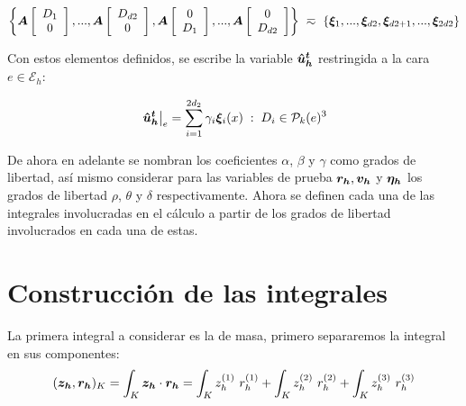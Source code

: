 \documentclass{article}
\begin{document}
\begin{equation*}
	\left \lbrace
	\boldsymbol{A} \left [ \begin{array}{cc} D_{1} \\ 0 \end{array}  \right ] , ..., \boldsymbol{A} \left [ \begin{array}{cc} D_{d2} \\ 0 \end{array}  \right ], \boldsymbol{A} \left [ \begin{array}{cc} 0 \\ D_{1} \end{array}  \right ] , ..., \boldsymbol{A} \left [ \begin{array}{cc} 0 \\ D_{d2} \end{array}  \right ]
	\right \rbrace
	~\eqsim~
	\left \lbrace
	\boldsymbol{\xi}_1, ..., \boldsymbol{\xi}_{d2}, \boldsymbol{\xi}_{d2 + 1}, ..., \boldsymbol{\xi}_{2d2}
	\right \rbrace
\end{equation*}

\noindent Con estos elementos definidos, se escribe la variable $\boldsymbol{\hat{u}^t_h}$ restringida a la cara $e \in \mathcal{E}_h$:

\begin{equation*}
    \left . \boldsymbol{\hat{u}^t_h} \right |_e = \sum_{i=1}^{2d_2} \gamma_i \boldsymbol{\xi}_i(x)
    \hspace{1mm} : \hspace{1mm} D_i \in \mathcal{P}_k(e)^3
\end{equation*}

\noindent De ahora en adelante se nombran los coeficientes $\alpha$, $\beta$ y $\gamma$ como grados de libertad, así mismo considerar para las variables de prueba $\boldsymbol{r_h}, \boldsymbol{v_h}$ y $\boldsymbol{\eta_h}$ los grados de libertad $\rho$, $\theta$ y $\delta$ respectivamente. Ahora se definen cada una de las integrales involucradas en el cálculo a partir de los grados de libertad involucrados en cada una de estas.

\section{Construcción de las integrales}

\noindent La primera integral a considerar es la de masa, primero separaremos la integral en sus componentes:
\begin{equation*}
	(\boldsymbol{z_h}, \boldsymbol{r_h})_K = \int_{K} \boldsymbol{z_h} \cdot \boldsymbol{r_h} =
	\int_{K} z_h^{(1)}~r_h^{(1)} + \int_{K} z_h^{(2)}~r_h^{(2)} + \int_{K} z_h^{(3)}~r_h^{(3)}
\end{equation*}
\end{document}
